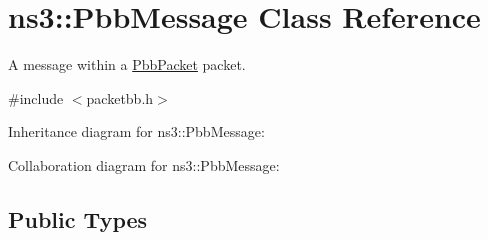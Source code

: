 \hypertarget{classns3_1_1PbbMessage}{}\section{ns3\+:\+:Pbb\+Message Class Reference}
\label{classns3_1_1PbbMessage}


A message within a \hyperlink{classns3_1_1PbbPacket}{Pbb\+Packet} packet.  




{\ttfamily \#include $<$packetbb.\+h$>$}



Inheritance diagram for ns3\+:\+:Pbb\+Message\+:


Collaboration diagram for ns3\+:\+:Pbb\+Message\+:
\subsection*{Public Types}
